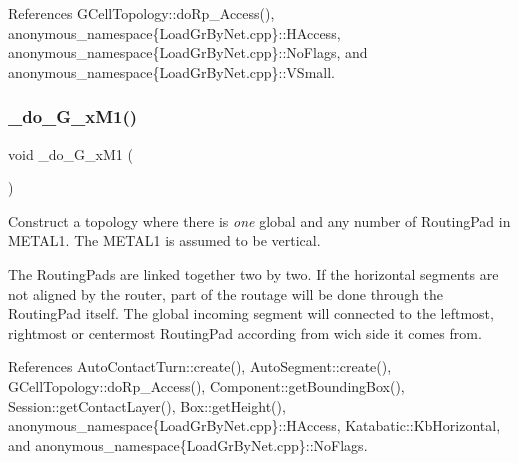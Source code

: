 References G\+Cell\+Topology\+::do\+Rp\+\_\+\+Access(), anonymous\+\_\+namespace\{\+Load\+Gr\+By\+Net.\+cpp\}\+::\+H\+Access, anonymous\+\_\+namespace\{\+Load\+Gr\+By\+Net.\+cpp\}\+::\+No\+Flags, and anonymous\+\_\+namespace\{\+Load\+Gr\+By\+Net.\+cpp\}\+::\+V\+Small.

\mbox{\label{group__LoadGlobalRouting_ga97942453a1bc5b01106aa380271fd7fc}} 
\subsubsection{\texorpdfstring{\+\_\+do\+\_\+G\+\_\+x\+M1()}{\_do\_1G\_xM1()}}
{\footnotesize\ttfamily void \+\_\+do\+\_\+G\+\_\+x\+M1 (\begin{DoxyParamCaption}{ }\end{DoxyParamCaption})\hspace{0.3cm}{\ttfamily [private]}}

Construct a topology where there is {\itshape one} global and any number of Routing\+Pad in {\ttfamily M\+E\+T\+A\+L1}. The {\ttfamily M\+E\+T\+A\+L1} is assumed to be vertical.

The Routing\+Pads are linked together two by two. If the horizontal segments are not aligned by the router, part of the routage will be done through the Routing\+Pad itself. The global incoming segment will connected to the leftmost, rightmost or centermost Routing\+Pad according from wich side it comes from.

 

References Auto\+Contact\+Turn\+::create(), Auto\+Segment\+::create(), G\+Cell\+Topology\+::do\+Rp\+\_\+\+Access(), Component\+::get\+Bounding\+Box(), Session\+::get\+Contact\+Layer(), Box\+::get\+Height(), anonymous\+\_\+namespace\{\+Load\+Gr\+By\+Net.\+cpp\}\+::\+H\+Access, Katabatic\+::\+Kb\+Horizontal, and anonymous\+\_\+namespace\{\+Load\+Gr\+By\+Net.\+cpp\}\+::\+No\+Flags.

\mbox{\label{group__LoadGlobalRouting_gae60ed4e27ad89a1e2ff2cd6415ef33f1}} 

